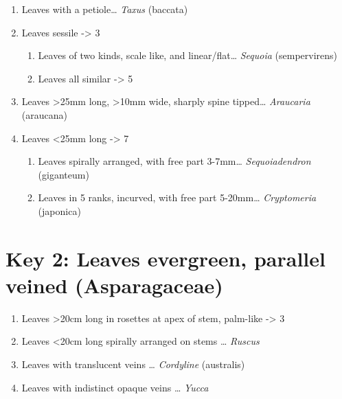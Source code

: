 \documentclass[openany]{book}
\providecommand{\tightlist}{%
  \setlength{\itemsep}{0pt}\setlength{\parskip}{0pt}}
\begin{document}
\begin{enumerate}
\def\labelenumi{\arabic{enumi}.}
\tightlist
\item
  Leaves with a petiole\ldots{} \emph{Taxus} (baccata)
\item
  Leaves sessile -\textgreater{} 3

  \begin{enumerate}
  \def\labelenumii{\arabic{enumii}.}
  \setcounter{enumii}{2}
  \tightlist
  \item
    Leaves of two kinds, scale like, and linear/flat\ldots{}
    \emph{Sequoia} (sempervirens)
  \item
    Leaves all similar -\textgreater{} 5
  \end{enumerate}
\item
  Leaves \textgreater{}25mm long, \textgreater{}10mm wide, sharply spine
  tipped\ldots{} \emph{Araucaria} (araucana)
\item
  Leaves \textless{}25mm long -\textgreater{} 7

  \begin{enumerate}
  \def\labelenumii{\arabic{enumii}.}
  \setcounter{enumii}{6}
  \tightlist
  \item
    Leaves spirally arranged, with free part 3-7mm\ldots{}
    \emph{Sequoiadendron} (giganteum)
  \item
    Leaves in 5 ranks, incurved, with free part 5-20mm\ldots{}
    \emph{Cryptomeria} (japonica)
  \end{enumerate}
\end{enumerate}

\hypertarget{key-2-leaves-evergreen-parallel-veined-asparagaceae}{%
\section{Key 2: Leaves evergreen, parallel veined
(Asparagaceae)}\label{key-2-leaves-evergreen-parallel-veined-asparagaceae}}

\begin{enumerate}
\def\labelenumi{\arabic{enumi}.}
\tightlist
\item
  Leaves \textgreater{}20cm long in rosettes at apex of stem, palm-like
  -\textgreater{} 3
\item
  Leaves \textless{}20cm long spirally arranged on stems \ldots{}
  \emph{Ruscus}
\item
  Leaves with translucent veins \ldots{} \emph{Cordyline} (australis)
\item
  Leaves with indistinct opaque veins \ldots{} \emph{Yucca}
\end{enumerate}
\end{document}
